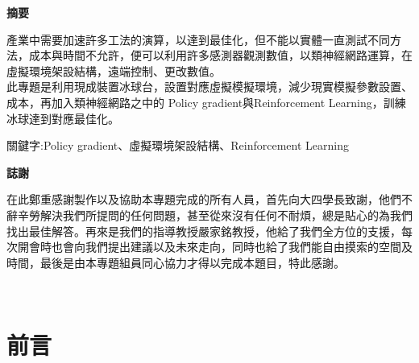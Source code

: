 \documentclass[14pt,a4paper]{report}  %
\begin{document}
\newpage
\clearpage
{} %
\begin{center}
\LARGE\textbf{摘要}\\
\begin{flushleft}
\fontsize{14pt}{2.5pt}\hspace{12pt} 產業中需要加速許多工法的演算，以達到最佳化，但不能以實體一直測試不同方法，成本與時間不允許，便可以利用許多感測器觀測數值，以類神經網路運算，在虛擬環境架設結構，遠端控制、更改數值。\\
\vspace{1em}
\sectionef\fontsize{14pt}{2.5pt}\hspace{12pt} 此專題是利用現成裝置冰球台，設置對應虛擬模擬環境，減少現實模擬參數設置、成本，再加入類神經網路之中的 Policy gradient與Reinforcement Learning，訓練冰球達到對應最佳化。\\
\end{flushleft}
\begin{center}
\fontsize{14pt}{2.5pt}關鍵字:\sectionef Policy gradient、虛擬環境架設結構、Reinforcement Learning
\end{center}
\newpage
\centerline\LARGE\textbf{誌謝}\\
\begin{flushleft}
\fontsize{14pt}{2.5pt}\hspace{12pt}在此鄭重感謝製作以及協助本專題完成的所有人員，首先向大四學長致謝，他們不辭辛勞解決我們所提問的任何問題，甚至從來沒有任何不耐煩，總是貼心的為我們找出最佳解答。再來是我們的指導教授嚴家銘教授，他給了我們全方位的支援，每次開會時也會向我們提出建議以及未來走向，同時也給了我們能自由摸索的空間及時間，最後是由本專題組員同心協力才得以完成本題目，特此感謝。
\end{flushleft}
\newpage
\renewcommand{\contentsname}{\centerline{\fontsize{18pt}{\baselineskip}\selectfont\textbf{目\quad 錄}}}
\tableofcontents　　%
\newpage
\renewcommand{\listfigurename}{\centerline{\fontsize{18pt}{\baselineskip}\selectfont\textbf{圖\quad 表\quad 目\quad 錄 }}}
\listoffigures
\newpage
\end{center}


\chapter{前言}
\setcounter{page}{1}  %
\fontsize{14pt}{2.5pt}\sectionef
\end{document}
